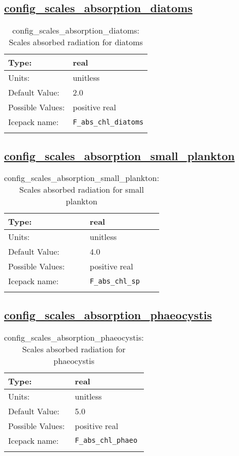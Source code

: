 \subsection[config\_scales\_absorption\_diatoms]{\hyperref[sec:nm_tab_biogeochemistry]{config\_scales\_absorption\_diatoms}}
\label{subsec:nm_sec_config_scales_absorption_diatoms}
\begin{center}
\begin{longtable}{| p{2.0in} || p{4.0in} |}
    \hline
    Type: & real \\
    \hline
    Units: & \si{unitless} \\
    \hline
    Default Value: & 2.0 \\
    \hline
    Possible Values: & positive real \\
    \hline
    Icepack name: & \verb+F_abs_chl_diatoms+ \\
    \hline
    \caption{config\_scales\_absorption\_diatoms: Scales absorbed radiation for diatoms}
\end{longtable}
\end{center}
\subsection[config\_scales\_absorption\_small\_plankton]{\hyperref[sec:nm_tab_biogeochemistry]{config\_scales\_absorption\_small\_plankton}}
\label{subsec:nm_sec_config_scales_absorption_small_plankton}
\begin{center}
\begin{longtable}{| p{2.0in} || p{4.0in} |}
    \hline
    Type: & real \\
    \hline
    Units: & \si{unitless} \\
    \hline
    Default Value: & 4.0 \\
    \hline
    Possible Values: & positive real \\
    \hline
    Icepack name: & \verb+F_abs_chl_sp+ \\
    \hline
    \caption{config\_scales\_absorption\_small\_plankton: Scales absorbed radiation for small plankton}
\end{longtable}
\end{center}
\subsection[config\_scales\_absorption\_phaeocystis]{\hyperref[sec:nm_tab_biogeochemistry]{config\_scales\_absorption\_phaeocystis}}
\label{subsec:nm_sec_config_scales_absorption_phaeocystis}
\begin{center}
\begin{longtable}{| p{2.0in} || p{4.0in} |}
    \hline
    Type: & real \\
    \hline
    Units: & \si{unitless} \\
    \hline
    Default Value: & 5.0 \\
    \hline
    Possible Values: & positive real \\
    \hline
    Icepack name: & \verb+F_abs_chl_phaeo+ \\
    \hline
    \caption{config\_scales\_absorption\_phaeocystis: Scales absorbed radiation for phaeocystis}
\end{longtable}
\end{center}
